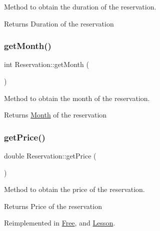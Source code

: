 Method to obtain the duration of the reservation. 

\begin{DoxyReturn}{Returns}
Duration of the reservation 
\end{DoxyReturn}
\mbox{\label{class_reservation_adbc454654e7e861d80c8740f85e0fb10}} 
\subsubsection{\texorpdfstring{get\+Month()}{getMonth()}}
{\footnotesize\ttfamily int Reservation\+::get\+Month (\begin{DoxyParamCaption}{ }\end{DoxyParamCaption})}



Method to obtain the month of the reservation. 

\begin{DoxyReturn}{Returns}
\mbox{\hyperlink{class_month}{Month}} of the reservation 
\end{DoxyReturn}
\mbox{\label{class_reservation_a62cdb2f1a24e2fce92fb9f024ae9f494}} 
\subsubsection{\texorpdfstring{get\+Price()}{getPrice()}}
{\footnotesize\ttfamily double Reservation\+::get\+Price (\begin{DoxyParamCaption}{ }\end{DoxyParamCaption})\hspace{0.3cm}{\ttfamily [virtual]}}



Method to obtain the price of the reservation. 

\begin{DoxyReturn}{Returns}
Price of the reservation 
\end{DoxyReturn}


Reimplemented in \mbox{\hyperlink{class_free_a229f009a7535eeba0a6ff4495de8c6bf}{Free}}, and \mbox{\hyperlink{class_lesson_ad7a2f708f870040627a442cdf000683f}{Lesson}}.

\mbox{\label{class_reservation_a28da7b16dadfeb33bf5351cabc8dbb0b}} 
